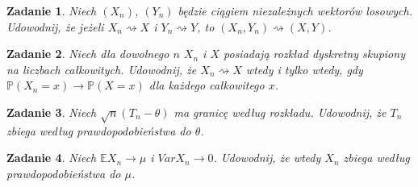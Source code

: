 \documentclass{mwart}
\newtheorem{zd}{Zadanie}
\begin{document}
\begin{zd}
Niech $(X_n)$, $(Y_n)$ będzie ciągiem niezależnych wektorów losowych. Udowodnij, że jeżeli $X_n \rightsquigarrow X$ i $Y_n \rightsquigarrow Y$, to $(X_n, Y_n) \rightsquigarrow (X, Y)$.
\end{zd}

\begin{zd}
Niech dla dowolnego $n$ $X_n$ i $X$ posiadają rozkład dyskretny skupiony na liczbach całkowitych. Udowodnij, że $X_n \rightsquigarrow X$ wtedy i tylko wtedy, gdy $\mathbb{P}(X_n=x) \to \mathbb{P}(X=x)$ dla każdego całkowitego $x$.
\end{zd}

\begin{zd}
Niech $\sqrt{n}(T_n-\theta)$ ma granicę według rozkładu. Udowodnij, że $T_n$ zbiega według prawdopodobieństwa do $\theta$.
\end{zd}

\begin{zd}
Niech $\mathbb{E}X_n \to \mu$ i $VarX_n \to 0$. Udowodnij, że wtedy $X_n$ zbiega według prawdopodobieństwa do $\mu$.
\end{zd}
\end{document}
